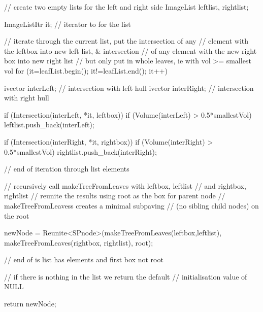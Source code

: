 \begin{DoxyCode}
{{{                // create two empty lists for the left and right side
                ImageList leftlist, rightlist;

                ImageListItr it; // iterator to for the list

                // iterate through the current list, put the intersection of
       any
                // element with the leftbox into new left list, & intersection
                // of any element with the new right box into new right list
                // but only put in whole leaves, ie with vol >= smallest vol
                for (it=leafList.begin(); it!=leafList.end(); it++) {
                    ivector interLeft;  // intersection with left hull
                    ivector interRight;  // intersection with right hull

                    if (Intersection(interLeft, *it, leftbox)) {
                        if (Volume(interLeft) > 0.5*smallestVol)
                            leftlist.push_back(interLeft);
                    }

                    if (Intersection(interRight, *it, rightbox)) {
                        if (Volume(interRight) > 0.5*smallestVol)
                            rightlist.push_back(interRight);
                    }

                } // end of iteration through list elements

                // recursively call makeTreeFromLeaves with leftbox, leftlist
                // and rightbox, rightlist
                // reunite the results using root as the box for parent node
                // makeTreeFromLeavess creates a minimal subpaving
                // (no sibling child nodes) on the root

                newNode = Reunite<SPnode>(makeTreeFromLeaves(leftbox,leftlist),
                                    makeTreeFromLeaves(rightbox, rightlist),
                                                                root);

            } // end of is list has elements and first box not root
        }

        // if there is nothing in the list we return the default
            // initialisation value of NULL

        return newNode;

    }
\end{DoxyCode}
